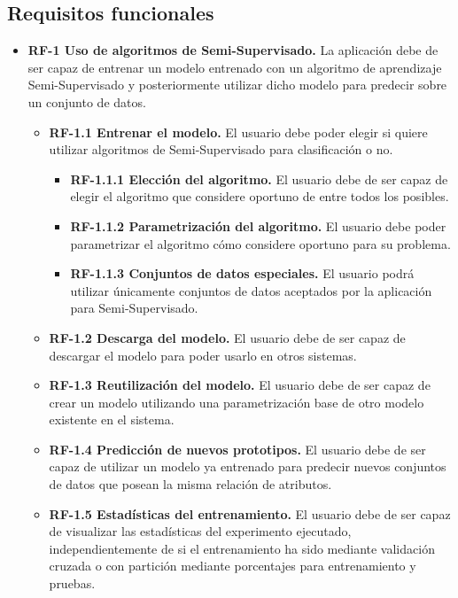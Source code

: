 \subsection{Requisitos funcionales}\label{requisitos-funcionales}
\begin{itemize}
\tightlist
\item
  \textbf{RF-1 Uso de algoritmos de Semi-Supervisado.} La aplicación debe de ser capaz de entrenar un modelo entrenado con un algoritmo de aprendizaje Semi-Supervisado y posteriormente utilizar dicho modelo para predecir sobre un conjunto de datos.

\begin{itemize}
\tightlist
\item \textbf{RF-1.1 Entrenar el modelo.} El usuario debe poder elegir si quiere utilizar algoritmos de Semi-Supervisado para clasificación o no.
    \begin{itemize}
    \tightlist
    \item \textbf{RF-1.1.1 Elección del algoritmo.} El usuario debe de ser capaz de elegir el algoritmo que considere oportuno de entre todos los posibles.
     \item \textbf{RF-1.1.2 Parametrización del algoritmo.} El usuario debe poder parametrizar el algoritmo cómo considere oportuno para su problema.
     \item \textbf{RF-1.1.3 Conjuntos de datos especiales.} El usuario podrá utilizar únicamente conjuntos de datos aceptados por la aplicación para Semi-Supervisado.
    \end{itemize}
    \item \textbf{RF-1.2 Descarga del modelo.} El usuario debe de ser capaz de descargar el modelo para poder usarlo en otros sistemas.
    \item \textbf{RF-1.3 Reutilización del modelo.} El usuario debe de ser capaz de crear un modelo  utilizando una parametrización base de otro modelo existente en el sistema.
    \item \textbf{RF-1.4 Predicción de nuevos prototipos.} El usuario debe de ser capaz de utilizar un modelo ya entrenado para predecir nuevos conjuntos de datos que posean la misma relación de atributos.
    \item \textbf{RF-1.5 Estadísticas del entrenamiento.} El usuario debe de ser capaz de visualizar las estadísticas del experimento ejecutado, independientemente de si el entrenamiento ha sido mediante validación cruzada o con partición mediante porcentajes para entrenamiento y pruebas.
  \end{itemize}

\end{itemize}
